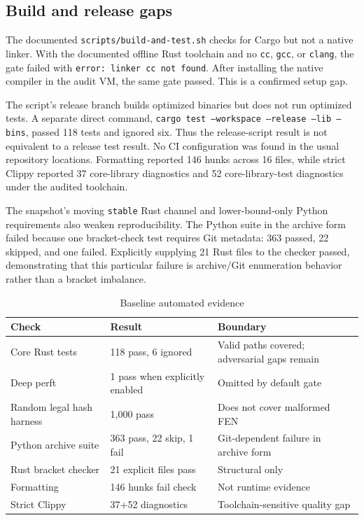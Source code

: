 \documentclass[conference]{IEEEtran}
\newcommand{\code}[1]{\texttt{\small #1}}
\begin{document}
\subsection{Build and release gaps}
The documented \code{scripts/build-and-test.sh} checks for Cargo but not a native linker. With the documented offline Rust toolchain and no \code{cc}, \code{gcc}, or \code{clang}, the gate failed with \code{error: linker cc not found}. After installing the native compiler in the audit VM, the same gate passed. This is a confirmed setup gap.

The script's release branch builds optimized binaries but does not run optimized tests. A separate direct command, \code{cargo test --workspace --release --lib --bins}, passed 118 tests and ignored six. Thus the release-script result is not equivalent to a release test result. No CI configuration was found in the usual repository locations. Formatting reported 146 hunks across 16 files, while strict Clippy reported 37 core-library diagnostics and 52 core-library-test diagnostics under the audited toolchain.

The snapshot's moving \code{stable} Rust channel and lower-bound-only Python requirements also weaken reproducibility. The Python suite in the archive form failed because one bracket-check test requires Git metadata: 363 passed, 22 skipped, and one failed. Explicitly supplying 21 Rust files to the checker passed, demonstrating that this particular failure is archive/Git enumeration behavior rather than a bracket imbalance.

\begin{table}[t]
\caption{Baseline automated evidence}
\label{tab:baseline}
\centering
\footnotesize
\begin{tabularx}{\columnwidth}{@{}Y Y Y@{}}
\toprule
Check & Result & Boundary \\
\midrule
Core Rust tests & 118 pass, 6 ignored & Valid paths covered; adversarial gaps remain \\
Deep perft & 1 pass when explicitly enabled & Omitted by default gate \\
Random legal hash harness & 1,000 pass & Does not cover malformed FEN \\
Python archive suite & 363 pass, 22 skip, 1 fail & Git-dependent failure in archive form \\
Rust bracket checker & 21 explicit files pass & Structural only \\
Formatting & 146 hunks fail check & Not runtime evidence \\
Strict Clippy & 37+52 diagnostics & Toolchain-sensitive quality gap \\
\bottomrule
\end{tabularx}
\end{table}
\end{document}
